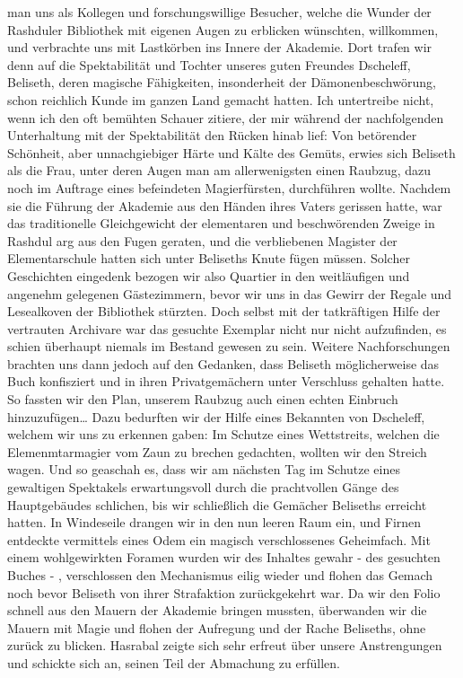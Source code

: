 man uns als Kollegen und forschungswillige Besucher, welche die Wunder der Rashduler Bibliothek mit eigenen Augen zu erblicken wünschten, willkommen, und verbrachte uns mit Lastkörben ins Innere der Akademie. Dort trafen wir denn auf die Spektabilität und Tochter unseres guten Freundes Dscheleff, Beliseth, deren magische Fähigkeiten, insonderheit der Dämonenbeschwörung, schon reichlich Kunde im ganzen Land gemacht hatten.
Ich untertreibe nicht, wenn ich den oft bemühten Schauer zitiere, der mir während der nachfolgenden Unterhaltung mit der Spektabilität den Rücken hinab lief: Von betörender Schönheit, aber unnachgiebiger Härte und Kälte des Gemüts, erwies sich Beliseth als die Frau, unter deren Augen man am allerwenigsten einen Raubzug, dazu noch im Auftrage eines befeindeten Magierfürsten, durchführen wollte. Nachdem sie die Führung der Akademie aus den Händen ihres Vaters gerissen hatte, war das traditionelle Gleichgewicht der elementaren und beschwörenden Zweige in Rashdul arg aus den Fugen geraten, und die verbliebenen Magister der Elementarschule hatten sich unter Beliseths Knute fügen müssen. Solcher Geschichten eingedenk bezogen wir also Quartier in den weitläufigen und angenehm gelegenen Gästezimmern, bevor wir uns in das Gewirr der Regale und Lesealkoven der Bibliothek stürzten. Doch selbst mit der tatkräftigen Hilfe der vertrauten Archivare war das gesuchte Exemplar nicht nur nicht aufzufinden, es schien überhaupt niemals im Bestand gewesen zu sein. Weitere Nachforschungen brachten uns dann jedoch auf den Gedanken, dass Beliseth möglicherweise das Buch konfisziert und in ihren Privatgemächern unter Verschluss gehalten hatte. So fassten wir den Plan, unserem Raubzug auch einen echten Einbruch hinzuzufügen\dots
Dazu bedurften wir der Hilfe eines Bekannten von Dscheleff, welchem wir uns zu erkennen gaben: Im Schutze eines Wettstreits, welchen die Elemenmtarmagier vom Zaun zu brechen gedachten, wollten wir den Streich wagen. Und so geaschah es, dass wir am nächsten Tag im Schutze eines gewaltigen Spektakels erwartungsvoll durch die prachtvollen Gänge des Hauptgebäudes schlichen, bis wir schließlich die Gemächer Beliseths erreicht hatten. In Windeseile drangen wir in den nun leeren Raum ein, und Firnen entdeckte vermittels eines Odem ein magisch verschlossenes Geheimfach. Mit einem wohlgewirkten Foramen wurden wir des Inhaltes gewahr - des gesuchten Buches - , verschlossen den Mechanismus eilig wieder und flohen das Gemach noch bevor Beliseth von ihrer Strafaktion zurückgekehrt war. Da wir den Folio schnell aus den Mauern der Akademie bringen mussten, überwanden wir die Mauern mit Magie und flohen der Aufregung und der Rache Beliseths, ohne zurück zu blicken.
Hasrabal zeigte sich sehr erfreut über unsere Anstrengungen und schickte sich an, seinen Teil der Abmachung zu erfüllen.

